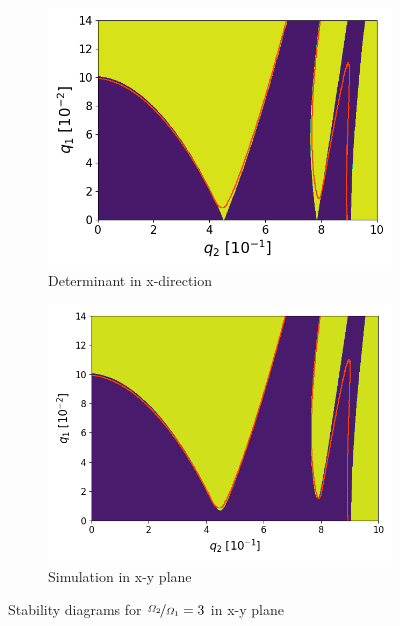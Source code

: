 \begin{figure}[H]
\begin{subfigure}{.5\textwidth}
  \centering
  \includegraphics[width=\linewidth]{img/0_ions_1_electrons_q1_0.0-0.14_q2_0.0-1.0_992x984_3_edge.png}%
  \caption{Determinant in x-direction}
  \label{fig:det_3_x-direction}
\end{subfigure}%
\begin{subfigure}{.5\textwidth}
  \centering
  \includegraphics[width=\linewidth]{img/0_ions_1_electrons_q1_0.0-0.14_q2_0.0-1.0_992x984_3_edge_sim.png}  
  \caption{Simulation in x-y plane}
  \label{fig:sim_3_x-direction}
\end{subfigure}
\caption{Stability diagrams for $\nicefrac{\Omega_2}{\Omega_1} = 3$ in x-y plane}
\label{fig:stabil-eta=3_x-y_directions}
\end{figure} 
